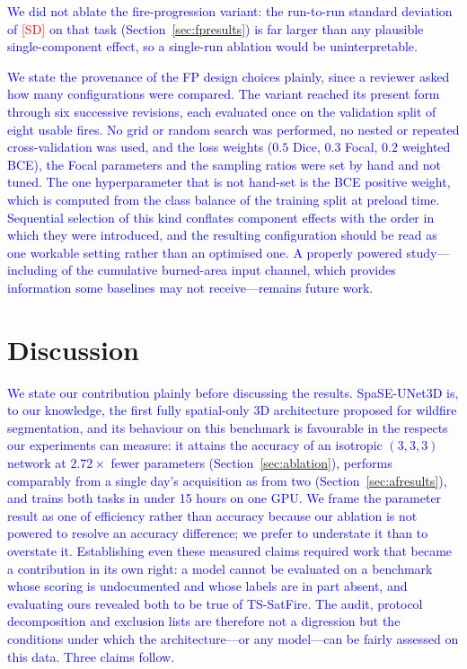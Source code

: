 \documentclass[sensors,article,submit,moreauthors,pdftex]{Definitions/mdpi}
\newcommand{\rev}[1]{\textcolor{blue}{#1}}
\newcommand{\fpSD}{\textcolor{red}{[SD]}}
\begin{document}
\rev{We did not ablate the fire-progression variant: the run-to-run standard
deviation of \fpSD{} on that task (Section~\ref{sec:fpresults}) is far larger
than any plausible single-component effect, so a single-run ablation would be
uninterpretable.}

\rev{We state the provenance of the FP design choices plainly, since a reviewer
asked how many configurations were compared. The variant reached its present
form through six successive revisions, each evaluated once on the validation
split of eight usable fires. No grid or random search was performed, no nested
or repeated cross-validation was used, and the loss weights ($0.5$ Dice, $0.3$
Focal, $0.2$ weighted BCE), the Focal parameters and the sampling ratios were
set by hand and not tuned. The one hyperparameter that is not hand-set is the
BCE positive weight, which is computed from the class balance of the training
split at preload time. Sequential selection of this kind conflates component
effects with the order in which they were introduced, and the resulting
configuration should be read as one workable setting rather than an optimised
one. A properly powered study---including of the cumulative burned-area input
channel, which provides information some baselines may not receive---remains
future work.}

\section{Discussion}
\label{sec:discussion}

\rev{We state our contribution plainly before discussing the results.
SpaSE-UNet3D is, to our knowledge, the first fully spatial-only 3D
architecture proposed for wildfire segmentation, and its behaviour on this
benchmark is favourable in the respects our experiments can measure: it attains
the accuracy of an isotropic $(3,3,3)$ network at $2.72\times$ fewer parameters
(Section~\ref{sec:ablation}), performs comparably from a single day's
acquisition as from two (Section~\ref{sec:afresults}), and trains both tasks in
under 15 hours on one GPU. We frame the parameter result as one of efficiency
rather than accuracy because our ablation is not powered to resolve an accuracy
difference; we prefer to understate it than to overstate it. Establishing even
these measured claims required work that became a contribution in its own right:
a model cannot be evaluated on a benchmark whose scoring is undocumented and
whose labels are in part absent, and evaluating ours revealed both to be true of
TS-SatFire. The audit, protocol decomposition and exclusion lists are therefore
not a digression but the conditions under which the architecture---or any
model---can be fairly assessed on this data. Three claims follow.}
\end{document}
